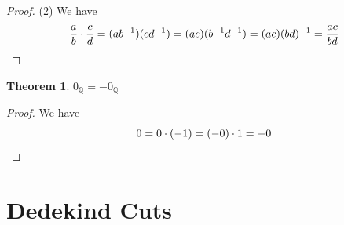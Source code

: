 \documentclass{report}
\newtheorem{theorem}[theo]{Theorem}
\begin{document}
\begin{proof}(2)
We have
\begin{equation*}
\frac ab\cdot\frac cd=(ab^{-1})(cd^{-1})=(ac)(b^{-1}d^{-1})=(ac)(bd)^{-1}=\frac{ac}{bd}\qedhere
\end{equation*}
\end{proof}
\begin{theorem}
$0_{\mathbb Q}=-0_{\mathbb Q}$ 
\end{theorem}
\begin{proof}
We have
\begin{equation*}
0=0\cdot(-1)=(-0)\cdot1=-0\qedhere
\end{equation*}
\end{proof}
\newpage

\section{Dedekind Cuts}
\end{document}
